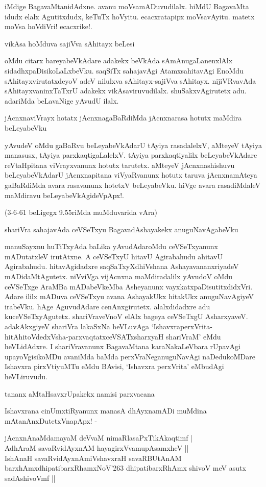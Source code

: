 iMdige BagavaMtanidAdxne. avanu moVsamADuvudilalx. hiMdU BagavaMta idudx elalx Agutitxdudx, keTuTx hoVyitu. ecacxratapipx moVsavAyitu. matetx moVsa hoVdiVri! ecacxrike!.

vikAsa hoMduva sajiVva sAhitayx beLesi

oMdu citarx bareyabeVkAdare adakekx beVkAda sAmAnugaLanenxlAlx sidadhxpaDisikoLaLxbeVku. saqSiTx sahajavAgi AtamxsahitavAgi EnoMdu sAhitayxvirutatxdeyoV adeV nilulxva sAhitayx-sajiVva sAhitayx. nijiVRvavAda sAhitayxvaninxTaTxrU adakekx vikAsaviruvudilalx. shuSakxvAgirutetx adu. adariMda beLavaNige yAvudU ilalx.

jAcnxnaviVrayx hotatx jAcnxnagaBaRdiMda jAcnxnarasa hotutx maMdira beLeyabeVku

yAvudeV oMdu gaBaRvu beLeyabeVkAdarU tAyiya rasadalelxV, aMteyeV tAyiya manasusx, tAyiya parxkaqtigaLalelxV. tAyiya parxkaqtiyalilx beLeyabeVkAdare reVtaHpitana viVrayxvanunx hotutx tarutetx. aMteyeV jAcnxnashishuvu beLeyabeVkAdarU jAcnxnapitana viVyaRvanunx hotutx taruva jAcnxnamAteya gaBaRdiMda avara rasavanunx hotetxV beLeyabeVku. hiVge avara rasadiMdaleV maMdiravu beLeyabeVkAgideVpApx!.

(3-6-61 beLigegx 9.55riMda muMduvarida vAra)

shariVra sahajavAda ceVSeTxyu BagavadAshayakekx anuguNavAgabeVku

manuSayxnu huTiTxyAda baLika yAvudAdaroMdu ceVSeTxyanunx mADutatxleV irutAtxne. A ceVSeTxyU hitavU Agirabahudu ahitavU Agirabahudu. hitavAgidadxre saqSaTxyXdhiVshana AshayavananxriyadeV mADidaMtAgutetx. niVviVga vijAcnxna maMdiradalilx yAvudoV oMdu ceVSeTxge AraMBa mADabeVkeMba Asheyanunx vayxkatxpaDisutitxdidxVri. Adare ililx mADuva ceVSeTxyu avana AshayakUkx hitakUkx anuguNavAgiyeV irabeVku. hAge AguvudAdare cenAnxgirutetx. alalxdidadxre adu kuceVSeTxyAgutetx. shariVraveVnoV elAlx bageya ceVSeTxgU AsharxyaveV. adakAkxgiyeV shariVra lakaSxNa heVLuvAga `IshavxraperxVrita-hitAhitoVdedxVsha-parxvaqtatxceVSATxsharxyaH shariVraM' eMdu heVLidAdxre. I shariVravanunx BagavaMtana karaNakaLeVbara rUpavAgi upayoVgisikoMDu avaniMda baMda perxVraNeganuguNavAgi naDedukoMDare Ishavxra pirxVtiyuMTu eMdu BAvisi, `Ishavxra perxVrita' eMbudAgi heVLiruvudu.

tananx aMtaHsavxrUpakekx namisi parxvacana

Ishavxrana cinUmxtiRyanunx manasA dhAyxnamADi muMdina mAtanAnxDutetxVnapApx! -

\begin{shloka}
jAcnxnAnaMdamayaM deVvaM nimaRlasaPxTikAkaqtimf |\\
AdhAraM savaRvidAyxnAM hayagirxVvamupAsamxheV ||\\

IshAnaH savaRvidAyxnAmiVshavxraH savaRBUtAnAM\\
barxhAmxdhipatibarxRhamxNoV\char'263 dhipatibarxRhAmx shivoV meV asutx sadAshivoVmf ||
\end{shloka}


